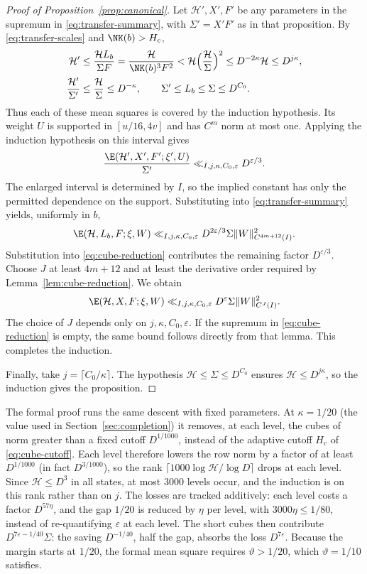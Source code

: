 \begin{proof}[Proof of Proposition~\ref{prop:canonical}]
Let $\mathcal H',X',F'$ be any parameters in the supremum in
\eqref{eq:transfer-summary}, with $\Sigma'=X'F'$ as in that proposition.
By \eqref{eq:transfer-scales} and $\NK(b)>H_c$,
\[
 \begin{aligned}
 \mathcal H'
 &\le\frac{\mathcal H L_b}{\Sigma F}
 =\frac{\mathcal H}{\NK(b)^3F^2}
 <\mathcal H\Bigl(\frac{\mathcal H}{\Sigma}\Bigr)^2
 \le D^{-2\kappa}\mathcal H\le D^{j\kappa},\\
 \frac{\mathcal H'}{\Sigma'}
 &\le\frac{\mathcal H}{\Sigma}\le D^{-\kappa},
 \qquad \Sigma'\le L_b\le\Sigma\le D^{C_0}.
 \end{aligned}
\]
Thus each of these mean squares is covered by the induction hypothesis.
Its weight $U$ is supported in $[u/16,4v]$ and has $C^m$ norm at most one.
Applying the induction hypothesis on this interval gives
\[
 \frac{\E(\mathcal H',X',F';\xi',U)}{\Sigma'}
 \ll_{I,j,\kappa,C_0,\varepsilon}D^{\varepsilon/3}.
\]
The enlarged interval is determined by $I$, so the implied constant
has only the permitted dependence on the support.
Substituting into \eqref{eq:transfer-summary} yields, uniformly in $b$,
\[
 \E(\mathcal H,L_b,F;\xi,W)
 \ll_{I,j,\kappa,C_0,\varepsilon}
 D^{2\varepsilon/3}\Sigma\|W\|_{C^{4m+12}(I)}^2.
\]
Substitution into \eqref{eq:cube-reduction} contributes the remaining
factor $D^{\varepsilon/3}$. Choose $J$ at least $4m+12$ and at least
the derivative order required by Lemma~\ref{lem:cube-reduction}.
We obtain
\[
 \E(\mathcal H,X,F;\xi,W)
 \ll_{I,j,\kappa,C_0,\varepsilon}
 D^\varepsilon\Sigma\|W\|_{C^J(I)}^2.
\]
The choice of $J$ depends only on $j,\kappa,C_0,\varepsilon$.
If the supremum in \eqref{eq:cube-reduction} is empty, the same bound
follows directly from that lemma. This completes the induction.

Finally, take $j=\lceil C_0/\kappa\rceil$.
The hypothesis $\mathcal H\le\Sigma\le D^{C_0}$ ensures
$\mathcal H\le D^{j\kappa}$, so the induction gives the proposition.
\end{proof}

\begin{remark}\label{rem:formal-descent}
The formal proof runs the same descent with fixed parameters. At $\kappa=1/20$ (the value used in
Section~\ref{sec:completion}) it removes, at each level, the cubes of norm greater than a fixed
cutoff $D^{1/1000}$, instead of the adaptive cutoff $H_c$ of \eqref{eq:cube-cutoff}. Each level
therefore lowers the row norm by a factor of at least $D^{1/1000}$ (in fact $D^{3/1000}$), so the
rank $\lceil1000\log\mathcal H/\log D\rceil$ drops at each level. Since $\mathcal H\le D^3$ in all
states, at most $3000$ levels occur, and the induction is on this rank rather than on $j$. The losses
are tracked additively: each level costs a factor $D^{57\eta}$, and the gap $1/20$ is reduced
by $\eta$ per level, with $3000\eta\le1/80$, instead of re-quantifying $\varepsilon$ at each
level. The short cubes then contribute $D^{7\varepsilon-1/40}\Sigma$: the saving $D^{-1/40}$,
half the gap, absorbs the loss $D^{7\varepsilon}$. Because the margin starts at $1/20$, the
formal mean square requires $\vartheta>1/20$, which $\vartheta=1/10$ satisfies.
\end{remark}

